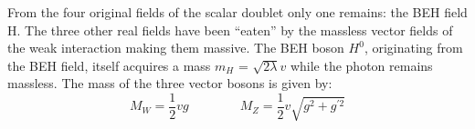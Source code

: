 From the four original fields of the scalar doublet only one remains: the BEH field H. The three other real fields have been ``eaten'' by the massless vector fields of the weak interaction making them massive.
The BEH boson $H^{0}$, originating from the BEH field, itself acquires a mass $m_{H}$ = $\sqrt{2 \lambda}v$ while the photon remains massless. The mass of the three vector bosons is given by: %
\begin{equation}\label{eq::VectorBosonMasses}
 M_W = \frac{1}{2} v g \qquad \qquad M_Z = \frac{1}{2} v \sqrt{g^2 + g^{'2}}
\end{equation}

